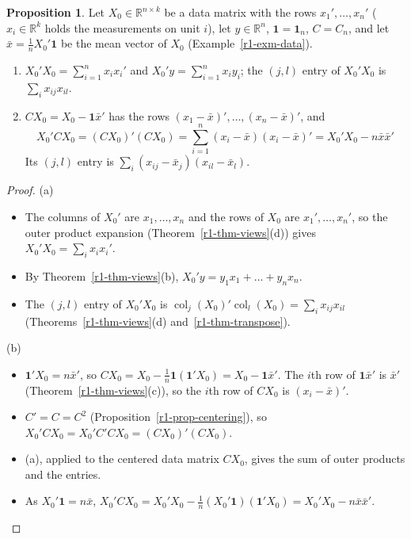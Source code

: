 \documentclass[12pt]{article}
\newcommand{\R}{\mathbb R}
\newcommand{\one}{\mathbf 1}
\DeclareMathOperator{\col}{col}
\theoremstyle{definition}
\newtheorem{proposition}[theorem]{Proposition}
\begin{document}
\begin{proposition}\label{r1-prop-ssp}
Let \(X_0\in\R^{n\times k}\) be a data matrix with the rows \(x_1',\dots,x_n'\) (\(x_i\in\R^k\) holds the
measurements on unit \(i\)), let \(y\in\R^n\), \(\one=\one_n\), \(C=C_n\), and let \(\bar x=\frac1nX_0'\one\) be the
mean vector of \(X_0\) (Example~\ref{r1-exm-data}).
\begin{enumerate}
\item \(X_0'X_0=\sum_{i=1}^nx_ix_i'\) and \(X_0'y=\sum_{i=1}^nx_iy_i\); the \((j,l)\) entry of \(X_0'X_0\) is
\(\sum_ix_{ij}x_{il}\).
\item \(CX_0=X_0-\one\bar x'\) has the rows \((x_1-\bar x)',\dots,(x_n-\bar x)'\), and
\[
X_0'CX_0=(CX_0)'(CX_0)=\sum_{i=1}^n(x_i-\bar x)(x_i-\bar x)'=X_0'X_0-n\bar x\bar x'
\]
Its \((j,l)\) entry is \(\sum_i(x_{ij}-\bar x_j)(x_{il}-\bar x_l)\).
\end{enumerate}
\end{proposition}
\begin{proof}
(a)
\begin{itemize}
\item The columns of \(X_0'\) are \(x_1,\dots,x_n\) and the rows of \(X_0\) are \(x_1',\dots,x_n'\), so the outer
product expansion (Theorem~\ref{r1-thm-views}(d)) gives \(X_0'X_0=\sum_ix_ix_i'\).
\item By Theorem~\ref{r1-thm-views}(b), \(X_0'y=y_1x_1+\dots+y_nx_n\).
\item The \((j,l)\) entry of \(X_0'X_0\) is \(\col_j(X_0)'\col_l(X_0)=\sum_ix_{ij}x_{il}\)
(Theorems~\ref{r1-thm-views}(d) and~\ref{r1-thm-transpose}).
\end{itemize}
(b)
\begin{itemize}
\item \(\one'X_0=n\bar x'\), so \(CX_0=X_0-\frac1n\one(\one'X_0)=X_0-\one\bar x'\). The \(i\)th row of \(\one\bar x'\) is
\(\bar x'\) (Theorem~\ref{r1-thm-views}(c)), so the \(i\)th row of \(CX_0\) is \((x_i-\bar x)'\).
\item \(C'=C=C^2\) (Proposition~\ref{r1-prop-centering}), so \(X_0'CX_0=X_0'C'CX_0=(CX_0)'(CX_0)\).
\item (a), applied to the centered data matrix \(CX_0\), gives the sum of outer products and the entries.
\item As \(X_0'\one=n\bar x\), \(X_0'CX_0=X_0'X_0-\frac1n(X_0'\one)(\one'X_0)=X_0'X_0-n\bar x\bar x'\).
\end{itemize}
\end{proof}
\end{document}
